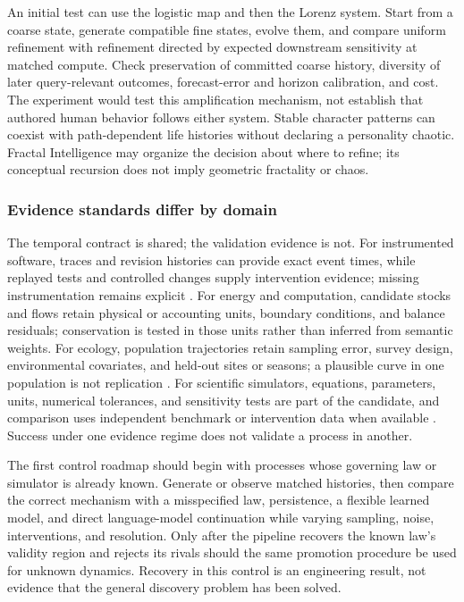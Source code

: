 \documentclass[10pt]{article}
\begin{document}
An initial test can use the logistic map and then the Lorenz system. Start
from a coarse state, generate compatible fine states, evolve them, and compare
uniform refinement with refinement directed by expected downstream sensitivity
at matched compute. Check preservation of committed coarse history, diversity
of later query-relevant outcomes, forecast-error and horizon calibration, and
cost. The experiment would test this amplification mechanism, not establish
that authored human behavior follows either system. Stable character patterns
can coexist with path-dependent life histories without declaring a personality
chaotic. Fractal Intelligence may organize the decision about where to refine;
its conceptual recursion does not imply geometric fractality or chaos.

\subsubsection{Evidence standards differ by domain}

The temporal contract is shared; the validation evidence is not. For
instrumented software, traces and revision histories can provide exact event
times, while replayed tests and controlled changes supply intervention evidence;
missing instrumentation remains explicit
\cite{otelSignals2026,linuxFtrace2026}. For energy and computation, candidate
stocks and flows retain physical or accounting units, boundary conditions, and
balance residuals; conservation is tested in those units rather than inferred
from semantic weights. For ecology, population trajectories retain sampling
error, survey design, environmental covariates, and held-out sites or seasons;
a plausible curve in one population is not replication
\cite{may1974populations}. For scientific simulators, equations, parameters,
units, numerical tolerances, and sensitivity tests are part of the candidate,
and comparison uses independent benchmark or intervention data when available
\cite{clerx2020cellml,keating2020sbml,modelica2026spec}. Success under one
evidence regime does not validate a process in another.

The first control roadmap should begin with processes whose governing law or
simulator is already known. Generate or observe matched histories, then compare
the correct mechanism with a misspecified law, persistence, a flexible learned
model, and direct language-model continuation while varying sampling, noise,
interventions, and resolution. Only after the pipeline recovers the known law's
validity region and rejects its rivals should the same promotion procedure be
used for unknown dynamics. Recovery in this control is an engineering result,
not evidence that the general discovery problem has been solved.
\end{document}
